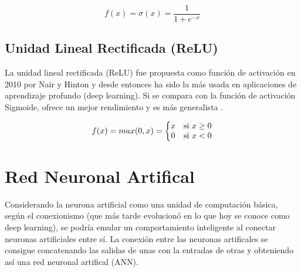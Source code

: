 \begin{equation}
 f(x) = \sigma (x) = \frac{1}{1+e^{-x}}
\end{equation}



\subsection{Unidad Lineal Rectificada (ReLU)}\label{subsubsec:relu}

La unidad lineal rectificada (ReLU) fue propuesta como función de activación en 2010 por Nair y Hinton \cite{Nair2010} y desde entonces ha sido la más usada en aplicaciones de aprendizaje profundo (deep learning). Si se compara con la función de activación Sigmoide, ofrece un mejor rendimiento y es más generalista \cite{nwankpa2018activation}.

\begin{equation}
 f(x) = max(0, x)=\left\{\begin{matrix}
 x & $si $ x \geq 0 \\ 
 0 & $si $ x < 0
\end{matrix}\right.
\end{equation}

\newpage\section{Red Neuronal Artifical}\label{subsec:neural_network}

Considerando la neurona artificial como una unidad de computación básica, según el conexionismo (que más tarde evolucionó en lo que hoy se conoce como deep learning), se podría emular un comportamiento inteligente al conectar neuronas artificiales entre sí. La conexión entre las neuronas artificales se consigue concatenando las salidas de unas con la entradas de otras y obteniendo así una red neuronal artifical (ANN).


